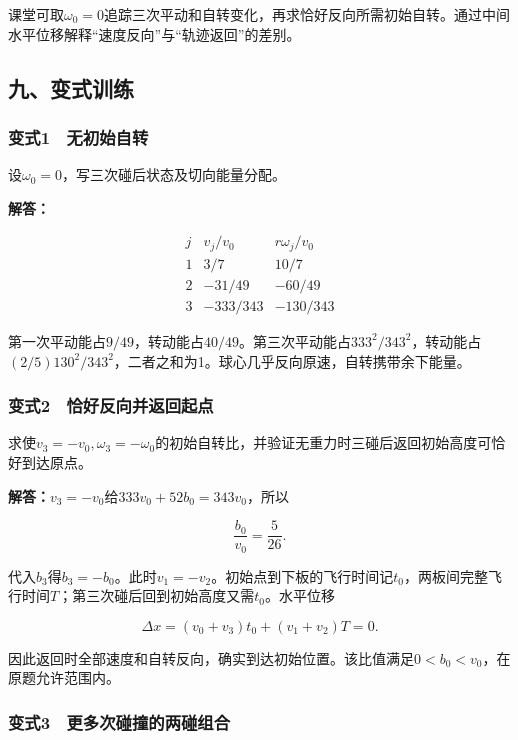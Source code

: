\documentclass[12pt,a4paper,fontset=fandol]{ctexart}
\begin{document}
课堂可取\(\omega_0=0\)追踪三次平动和自转变化，再求恰好反向所需初始自转。通过中间水平位移解释``速度反向''与``轨迹返回''的差别。

\subsection{九、变式训练}\label{ux4e5dux53d8ux5f0fux8badux7ec3-2}

\subsubsection{变式1　无初始自转}\label{ux53d8ux5f0f1-ux65e0ux521dux59cbux81eaux8f6c}

设\(\omega_0=0\)，写三次碰后状态及切向能量分配。

\textbf{解答：}

\[
\begin{array}{c|c|c}
j&v_j/v_0&r\omega_j/v_0\\ \hline
1&3/7&10/7\\
2&-31/49&-60/49\\
3&-333/343&-130/343
\end{array}
\]

第一次平动能占\(9/49\)，转动能占\(40/49\)。第三次平动能占\(333^2/343^2\)，转动能占\((2/5)130^2/343^2\)，二者之和为1。球心几乎反向原速，自转携带余下能量。

\subsubsection{变式2　恰好反向并返回起点}\label{ux53d8ux5f0f2-ux6070ux597dux53cdux5411ux5e76ux8fd4ux56deux8d77ux70b9}

求使\(v_3=-v_0,\omega_3=-\omega_0\)的初始自转比，并验证无重力时三碰后返回初始高度可恰好到达原点。

\textbf{解答：}\(v_3=-v_0\)给\(333v_0+52b_0=343v_0\)，所以

\[
\frac{b_0}{v_0}=\frac5{26}.
\]

代入\(b_3\)得\(b_3=-b_0\)。此时\(v_1=-v_2\)。初始点到下板的飞行时间记\(t_0\)，两板间完整飞行时间\(T\)；第三次碰后回到初始高度又需\(t_0\)。水平位移

\[
\Delta x=(v_0+v_3)t_0+(v_1+v_2)T=0.
\]

因此返回时全部速度和自转反向，确实到达初始位置。该比值满足\(0<b_0<v_0\)，在原题允许范围内。

\subsubsection{变式3　更多次碰撞的两碰组合}\label{ux53d8ux5f0f3-ux66f4ux591aux6b21ux78b0ux649eux7684ux4e24ux78b0ux7ec4ux5408}
\end{document}

